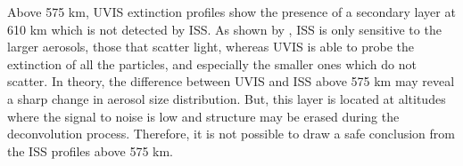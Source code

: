 Above 575 km, UVIS extinction profiles show the presence of a secondary layer at 610 km which is not detected
by ISS. As shown by \cite{Cours2011}, ISS is only sensitive to the larger aerosols, those that scatter light, whereas
UVIS is able to probe the extinction of all the particles, and especially the smaller ones which do not scatter.
In theory, the difference between UVIS and ISS above 575 km may reveal a sharp change in aerosol size distribution.
But, this layer is located at altitudes where the signal to noise is low and structure may be erased during the
deconvolution process. Therefore, it is not possible to draw a safe conclusion from the ISS profiles above 575 km.
